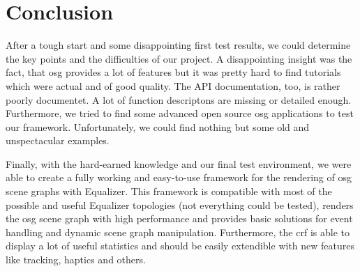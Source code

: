 
\chapter{Conclusion}
After a tough start and some disappointing first test results, we could determine the key points and the difficulties of our project. A disappointing insight was the fact, that \gls{osg} provides a lot of features but it was pretty hard to find tutorials which were actual and of good quality. The API documentation, too, is rather poorly documentet. A lot of function descriptons are missing or detailed enough. Furthermore, we tried to find some advanced open source \gls{osg} applications to test our framework. Unfortunately, we could find nothing but some old and unspectacular examples.

Finally, with the hard-earned knowledge and our final test environment, we were able to create a fully working and easy-to-use framework for the rendering of \gls{osg} scene graphs with Equalizer. This framework is compatible with most of the possible and useful Equalizer topologies (not everything could be tested), renders the \gls{osg} scene graph with high performance and provides basic solutions for event handling and dynamic scene graph manipulation. Furthermore, the \gls{crf} is able to display a lot of useful statistics and should be easily extendible with new features like tracking, haptics and others.

